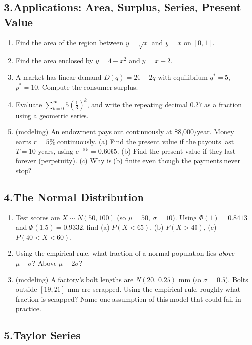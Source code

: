 \documentclass[11pt]{article}
\begin{document}
\subsection*{3.\quad Applications: Area, Surplus, Series, Present Value}

\begin{enumerate}[leftmargin=2em, itemsep=0.7em, start=12]
\item Find the area of the region between $y=\sqrt{x}$ and $y=x$ on $[0,1]$.
\item Find the area enclosed by $y=4-x^2$ and $y=x+2$.
\item A market has linear demand $D(q)=20-2q$ with equilibrium $q^*=5$, $p^*=10$. Compute the consumer surplus.
\item Evaluate $\displaystyle\sum_{k=0}^{\infty} 5\left(\tfrac{1}{3}\right)^k$, and write the repeating decimal $0.\overline{27}$ as a fraction using a geometric series.
\item (modeling) An endowment pays out continuously at \$8{,}000/year. Money earns $r=5\%$ continuously. (a) Find the present value if the payouts last $T=10$ years, using $e^{-0.5}=0.6065$. (b) Find the present value if they last forever (perpetuity). (c) Why is (b) finite even though the payments never stop?
\end{enumerate}

\subsection*{4.\quad The Normal Distribution}

\begin{enumerate}[leftmargin=2em, itemsep=0.7em, start=17]
\item Test scores are $X\sim N(50,100)$ (so $\mu=50$, $\sigma=10$). Using $\Phi(1)=0.8413$ and $\Phi(1.5)=0.9332$, find (a) $P(X<65)$, (b) $P(X>40)$, (c) $P(40<X<60)$.
\item Using the empirical rule, what fraction of a normal population lies \emph{above} $\mu+\sigma$? Above $\mu - 2\sigma$?
\item (modeling) A factory's bolt lengths are $N(20,\,0.25)$ mm (so $\sigma=0.5$). Bolts outside $[19,21]$ mm are scrapped. Using the empirical rule, roughly what fraction is scrapped? Name one assumption of this model that could fail in practice.
\end{enumerate}

\subsection*{5.\quad Taylor Series}
\end{document}
